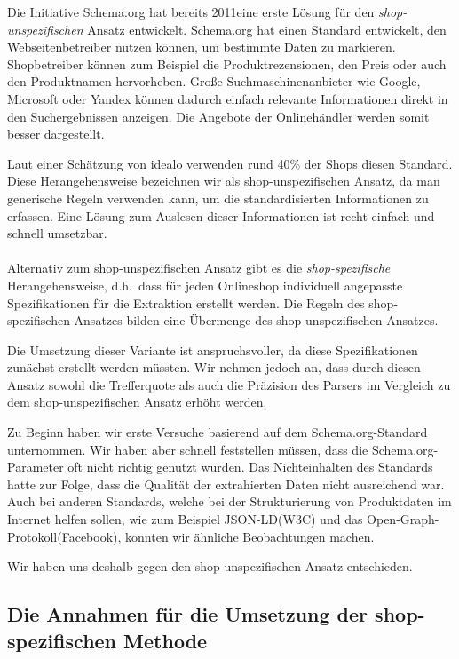 Die Initiative Schema.org hat bereits 2011\footnotemark eine erste Lösung für den \textit{shop-unspezifischen} Ansatz
entwickelt.
Schema.org hat einen Standard entwickelt, den Webseitenbetreiber nutzen können, um bestimmte Daten zu markieren.
Shopbetreiber können zum Beispiel die Produktrezensionen, den Preis oder auch den Produktnamen hervorheben.
Große Suchmaschinenanbieter wie Google, Microsoft oder Yandex können dadurch einfach relevante Informationen
direkt in den Suchergebnissen anzeigen.
Die Angebote der Onlinehändler werden somit besser dargestellt.

Laut einer Schätzung von idealo verwenden rund 40\% der Shops diesen Standard.
Diese Herangehensweise bezeichnen wir als shop-unspezifischen Ansatz, da man generische Regeln verwenden kann,
um die standardisierten Informationen zu erfassen.
Eine Lösung zum Auslesen dieser Informationen ist recht einfach und schnell umsetzbar.
\\
~\\
Alternativ zum shop-unspezifischen Ansatz gibt es die \textit{shop-spezifische} Herangehensweise, d.h.\ dass für jeden
Onlineshop individuell angepasste Spezifikationen für die Extraktion erstellt werden.
Die Regeln des shop-spezifischen Ansatzes bilden eine Übermenge des shop-unspezifischen Ansatzes.

Die Umsetzung dieser Variante ist anspruchsvoller, da diese Spezifikationen zunächst erstellt werden müssten.
Wir nehmen jedoch an, dass durch diesen Ansatz sowohl die Trefferquote als auch die Präzision des Parsers
im Vergleich zu dem shop-unspezifischen Ansatz erhöht werden.

Zu Beginn haben wir erste Versuche basierend auf dem Schema.org-Standard unternommen.
Wir haben aber schnell feststellen müssen, dass die Schema.org-Parameter oft nicht richtig genutzt wurden.
Das Nichteinhalten des Standards hatte zur Folge, dass die Qualität der extrahierten Daten nicht ausreichend war.
Auch bei anderen Standards, welche bei der Strukturierung von Produktdaten im Internet helfen sollen, wie zum Beispiel
JSON-LD\footnotemark (W3C) und das Open-Graph-Protokoll\footnotemark (Facebook), konnten wir ähnliche Beobachtungen
machen.

Wir haben uns deshalb gegen den shop-unspezifischen Ansatz entschieden.

\subsection{Die Annahmen für die Umsetzung der shop-spezifischen Methode}
\label{subsec:annahmen}

